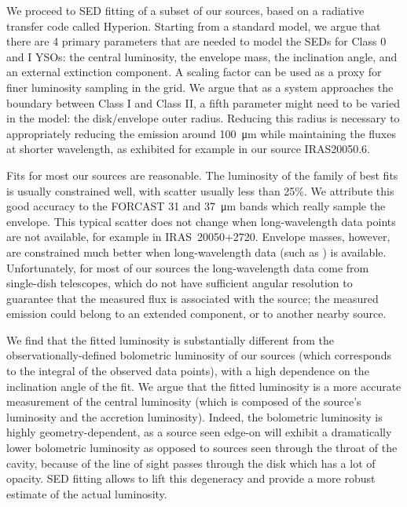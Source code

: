 
We proceed to SED fitting of a subset of our sources, based on a radiative transfer code called Hyperion. Starting from a standard model, we argue that there are 4 primary parameters that are needed to model the SEDs for Class 0 and I YSOs: the central luminosity, the envelope mass, the inclination angle, and an external extinction component. A scaling factor can be used as a proxy for finer luminosity sampling in the grid. We argue that as a system approaches the boundary between Class I and Class II, a fifth parameter might need to be varied in the model: the disk/envelope outer radius. Reducing this radius is necessary to appropriately reducing the emission around \SI{100}{\um} while maintaining the fluxes at shorter wavelength, as exhibited for example in our source IRAS20050.6. 

Fits for most our sources are reasonable. The luminosity of the family of best fits is usually constrained well, with scatter usually less than 25\%. We attribute this good accuracy to the FORCAST 31 and \SI{37}{\um} bands which really sample the envelope. This typical scatter does not change when long-wavelength data points are not available, for example in IRAS~20050+2720. Envelope masses, however, are constrained much better when long-wavelength data (such as \Herschel) is available. Unfortunately, for most of our sources the long-wavelength data come from single-dish telescopes, which do not have sufficient angular resolution to guarantee that the measured flux is associated with the source; the measured emission could belong to an extended component, or to another nearby source. 

We find that the fitted luminosity is substantially different from the observationally-defined bolometric luminosity of our sources (which corresponds to the integral of the observed data points), with a high dependence on the inclination angle of the fit. We argue that the fitted luminosity is a more accurate measurement of the central luminosity (which is composed of the source's luminosity and the accretion luminosity). Indeed, the bolometric luminosity is highly geometry-dependent, as a source seen edge-on will exhibit a dramatically lower bolometric luminosity as opposed to sources seen through the throat of the cavity, because of the line of sight passes through the disk which has a lot of opacity. SED fitting allows to lift this degeneracy and provide a more robust estimate of the actual luminosity.

